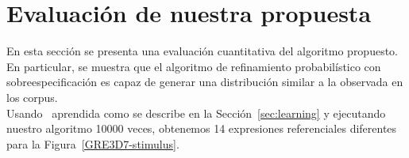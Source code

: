 \chapter{Evaluaci\'on de nuestra propuesta}
\label{sec:evaluacion}

En esta secci\'on se presenta una evaluaci\'on cuantitativa del algoritmo propuesto.
En particular, se muestra que el algoritmo de refinamiento probabil\'{i}stico con sobreespecificaci\'on es capaz de generar una distribuci\'on similar a la observada en los corpus.\\


Usando \puse\ aprendida como se describe en la Secci\'on~\ref{sec:learning} y ejecutando
nuestro algoritmo 10000 veces, obtenemos 14 expresiones referenciales diferentes
para la Figura~\ref{GRE3D7-stimulus}.

